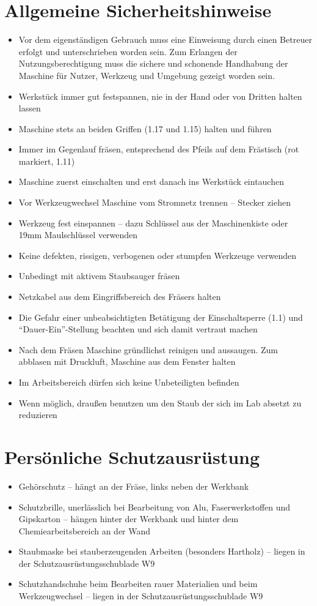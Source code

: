\documentclass{\basedir/fablab-document}
\begin{document}
\section[Allgemeine Sicherheitshinweise]{Allgemeine Sicherheitshinweise}
\begin{itemize}
\item {\color{red} Vor dem eigenständigen Gebrauch muss eine Einweisung durch einen Betreuer erfolgt und unterschrieben worden sein. Zum Erlangen der Nutzungsberechtigung muss die sichere und schonende Handhabung der Maschine für Nutzer, Werkzeug und Umgebung gezeigt worden sein.}
\item Werkstück immer gut festspannen, nie in der Hand oder von Dritten halten lassen
\item Maschine stets an beiden Griffen (1.17 und 1.15) halten und führen
\item Immer im Gegenlauf fräsen, entsprechend des Pfeils auf dem Frästisch (rot markiert, 1.11)
\item Maschine zuerst einschalten und erst danach ins Werkstück eintauchen
\item Vor Werkzeugwechsel Maschine vom Stromnetz trennen -- Stecker ziehen
\item Werkzeug fest einspannen -- dazu Schlüssel aus der Maschinenkiste oder 19mm Maulschlüssel verwenden
\item Keine defekten, rissigen, verbogenen oder stumpfen Werkzeuge verwenden
\item Unbedingt mit aktivem Staubsauger fräsen
\item Netzkabel aus dem Eingriffsbereich des Fräsers halten
\item Die Gefahr einer unbeabsichtigten Betätigung der Einschaltsperre (1.1) und ``Dauer-Ein''-Stellung beachten und sich damit vertraut machen
\item Nach dem Fräsen Maschine gründlichst reinigen und aussaugen. Zum abblasen mit Druckluft, Maschine aus dem Fenster halten
\item Im Arbeitsbereich dürfen sich keine Unbeteiligten befinden
\item Wenn möglich, draußen benutzen um den Staub der sich im Lab absetzt zu reduzieren
\end{itemize}


\section{Persönliche Schutzausrüstung}
\begin{itemize}
\item Gehörschutz -- hängt an der Fräse, links neben der Werkbank
\item Schutzbrille, unerlässlich bei Bearbeitung von Alu, Faserwerkstoffen und Gipskarton -- hängen hinter der Werkbank und hinter dem Chemiearbeitsbereich an der Wand
\item Staubmaske bei stauberzeugenden Arbeiten (besonders Hartholz) -- liegen in der Schutzausrüstungsschublade W9
\item Schutzhandschuhe beim Bearbeiten rauer Materialien und beim Werkzeugwechsel -- liegen in der Schutzausrüstungsschublade W9
\end{itemize}
\end{document}
